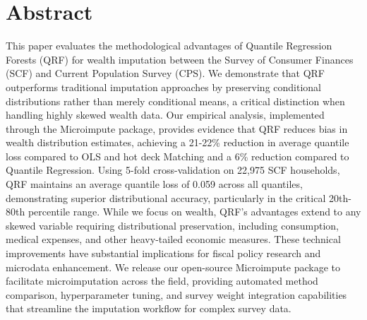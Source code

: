 \section*{Abstract}

This paper evaluates the methodological advantages of Quantile Regression Forests (QRF) for wealth imputation between the Survey of Consumer Finances (SCF) and Current Population Survey (CPS). We demonstrate that QRF outperforms traditional imputation approaches by preserving conditional distributions rather than merely conditional means, a critical distinction when handling highly skewed wealth data. Our empirical analysis, implemented through the Microimpute package, provides evidence that QRF reduces bias in wealth distribution estimates, achieving a 21-22\% reduction in average quantile loss compared to OLS and hot deck Matching and a 6\% reduction compared to Quantile Regression. Using 5-fold cross-validation on 22,975 SCF households, QRF maintains an average quantile loss of 0.059 across all quantiles, demonstrating superior distributional accuracy, particularly in the critical 20th-80th percentile range. While we focus on wealth, QRF's advantages extend to any skewed variable requiring distributional preservation, including consumption, medical expenses, and other heavy-tailed economic measures. These technical improvements have substantial implications for fiscal policy research and microdata enhancement. We release our open-source Microimpute package to facilitate microimputation across the field, providing automated method comparison, hyperparameter tuning, and survey weight integration capabilities that streamline the imputation workflow for complex survey data.